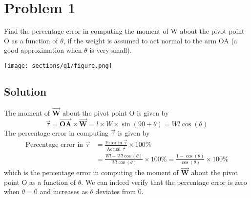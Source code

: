\section*{Problem 1}

Find the percentage error in computing the moment of W about the pivot point O as a function of \( \theta \), if the weight is assumed to act normal to the arm OA (a good approximation when \( \theta \) is very small).

\begin{figure*}[h]
    \centering
    \texttt{[image: sections/q1/figure.png]}
\end{figure*}

\subsection*{Solution}

The moment of \( \vec{\mathbf{W}} \) about the pivot point O is given by
\[
    \vec{\tau} = \vec{\mathbf{OA}} \times \vec{\mathbf{W}}
    = l \times W \times \sin(90 + \theta)
    = W l \cos(\theta)
\]
The percentage error in computing \( \vec{\tau} \) is given by
\begin{align*}
    \text{Percentage error in } \vec{\tau}
     & =
    \frac{\text{Error in }\vec{\tau}}{\text{Actual }\vec{\tau}} \times 100\% \\
     & = \frac{W l - W l \cos(\theta)}{W l \cos(\theta)} \times 100\%
    = \frac{1 - \cos(\theta)}{\cos(\theta)} \times 100\%
\end{align*}
which is the percentage error in computing the moment of \( \vec{\mathbf{W}} \) about the pivot point O as a function of \( \theta \).
We can indeed verify that the percentage error is zero when \( \theta = 0 \) and increases as \( \theta \) deviates from 0.
